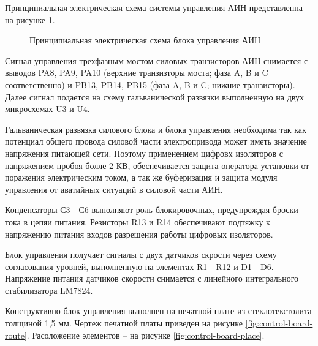         Принципиальная электрическая схема системы управления АИН представленна
        на рисунке \ref{fig:control-schematic}.

        \begin{figure}
            \caption{Принципиальная электрическая схема блока управления АИН}
            \label{fig:control-schematic}
        \end{figure}

        Сигнал управления трехфазным мостом силовых транзисторов АИН снимается
        с выводов PA8, PA9, PA10 (верхние транзизторы моста; фаза A, B и C
        соответственно) и PB13, PB14, PB15 (фаза A, B и C; нижние транзисторы).
        Далее сигнал подается на схему гальванической развязки выполненную на
        двух микросхемах U3 и U4. 
        
        Гальваническая развязка силового блока и блока управления необходима
        так как потенциал общего провода силовой части электропривода может
        иметь значение напряжения питающей сети. Поэтому применением цифровх
        изоляторов с напряжением пробоя болле 2 КВ, обеспечивается защита
        оператора установки от поражения электрическим током, а так же
        буферизация и защита модуля управления от аватийных ситуаций в силовой
        части АИН.

        Конденсаторы С3 - С6 выполняют роль блокировочных, предупреждая броски
        тока в цепяи питания. Резисторы R13 и R14 обеспечивают подтяжку к
        напряжению питания входов разрешения работы цифровых изоляторов.

        Блок управления получает сигналы с двух датчиков скрости через схему
        согласования уровней, выполненную на элементах R1 - R12 и D1 - D6.
        Напряжение питания датчиков скорости снимается с линейного
        интегрального стабилизатора LM7824.

        Конструктивно блок управления выполнен на печатной плате из
        стеклотекстолита толщиной 1,5 мм. Чертеж печатной платы приведен на
        рисунке \ref{fig:control-board-route}. Расоложение элементов -- на
        рисунке \ref{fig:control-board-place}.

